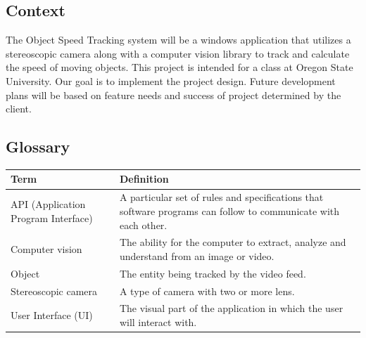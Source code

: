 \documentclass[letterpaper,10pt,onecolumn,draftclsnofoot]{IEEEtran}
\begin{document}

\subsection{Context}
The Object Speed Tracking system will be a windows application that utilizes a stereoscopic camera along with a computer vision library to track and calculate the speed of moving objects.
This project is intended for a class at Oregon State University. Our goal is to implement the project design.
Future development plans will be based on feature needs and success of project determined by the client.


\subsection{Glossary}
\begin{center}
	\begin{tabular}{|p{4cm}|p{12cm}|}
    
		\hline
		\textbf{Term} & \textbf{Definition} \\
		\hline
		API (Application Program Interface) & A particular set of rules and specifications that software programs can follow to communicate with each other. \\
		\hline
		Computer vision & The ability for the computer to extract, analyze and understand from an image or video. \\
		\hline
		Object & The entity being tracked by the video feed.  \\
		\hline
		Stereoscopic camera & A type of camera with two or more lens.  \\
		\hline
    	User Interface (UI) & The visual part of the application in which the user will interact with.  \\
		\hline
	
	\end{tabular}
\end{center}
\end{document}
